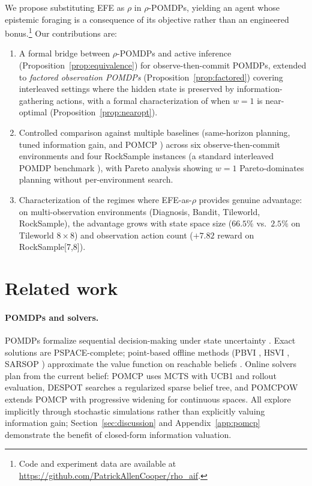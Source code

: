 \documentclass[runningheads]{llncs}
\begin{document}
We propose substituting EFE as $\rho$ in $\rho$-POMDPs, yielding an agent whose epistemic foraging is a consequence of its objective rather than an engineered bonus.\footnote{Code and experiment data are available at \url{https://github.com/PatrickAllenCooper/rho_aif}.} Our contributions are:
\begin{enumerate}
    \item A formal bridge between $\rho$-POMDPs and active inference (Proposition~\ref{prop:equivalence}) for observe-then-commit POMDPs, extended to \emph{factored observation POMDPs} (Proposition~\ref{prop:factored}) covering interleaved settings where the hidden state is preserved by information-gathering actions, with a formal characterization of when $w{=}1$ is near-optimal (Proposition~\ref{prop:nearopt}).
    \item Controlled comparison against multiple baselines (same-horizon planning, tuned information gain, and POMCP \citep{silver2010}) across six observe-then-commit environments and four RockSample instances (a standard interleaved POMDP benchmark \citep{smith2004}), with Pareto analysis showing $w{=}1$ Pareto-dominates planning without per-environment search.
    \item Characterization of the regimes where EFE-as-$\rho$ provides genuine advantage: on multi-observation environments (Diagnosis, Bandit, Tileworld, RockSample), the advantage grows with state space size ($66.5\%$ vs.\ $2.5\%$ on Tileworld $8{\times}8$) and observation action count ($+7.82$ reward on RockSample[7,8]).
\end{enumerate}

\section{Related work}

\paragraph{POMDPs and solvers.}
POMDPs formalize sequential decision-making under state uncertainty \citep{smallwood1973, kaelbling1998}. Exact solutions are PSPACE-complete; point-based offline methods (PBVI \citep{pineau2003}, HSVI \citep{smith2004}, SARSOP \citep{kurniawati2008}) approximate the value function on reachable beliefs \citep{shani2013}. Online solvers plan from the current belief: POMCP \citep{silver2010} uses MCTS with UCB1 and rollout evaluation, DESPOT \citep{ye2017} searches a regularized sparse belief tree, and POMCPOW \citep{sunberg2018} extends POMCP with progressive widening for continuous spaces. All explore implicitly through stochastic simulations rather than explicitly valuing information gain; Section~\ref{sec:discussion} and Appendix~\ref{app:pomcp} demonstrate the benefit of closed-form information valuation.
\end{document}
